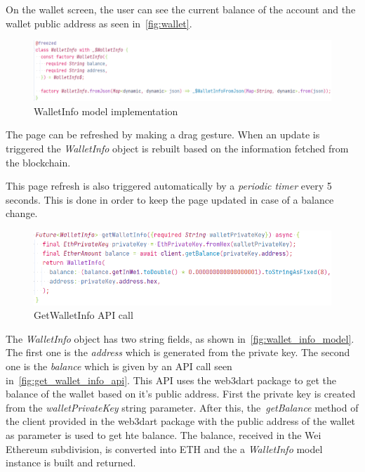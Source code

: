 \documentclass[a4paper,12pt]{report}
\begin{document}
On the wallet screen, the user can see the current balance of the account and
the wallet public address as seen in~\autoref{fig:wallet}.

\begin{figure}[H]
    \centering
    \includegraphics[scale=0.6]{images/code/wallet_info.png}
    \caption{WalletInfo model implementation}\label{fig:wallet_info_model}
\end{figure}

The page can be refreshed by making a drag gesture. When an update is triggered
the \textit{WalletInfo} object is rebuilt based on the information fetched from
the blockchain.

This page refresh is also triggered automatically by a \textit{periodic timer}
every 5 seconds. This is done in order to keep the page updated in case of a
balance change.

\begin{figure}[H]
    \centering
    \includegraphics[scale=0.6]{images/code/get_wallet_info.png}
    \caption{GetWalletInfo API call}\label{fig:get_wallet_info_api}
\end{figure}

The \textit{WalletInfo} object has two string fields, as shown
in~\autoref{fig:wallet_info_model}. The first one is the \textit{address} which
is generated from the private key. The second one is the \textit{balance} which
is given by an API call seen in~\autoref{fig:get_wallet_info_api}. This API
uses the web3dart package to get the balance of the wallet based on it's public
address. First the private key is created from the \textit{walletPrivateKey}
string parameter. After this, the~\textit{getBalance} method of the client
provided in the web3dart package with the public address of the wallet as
parameter is used to get hte balance. The balance, received in the Wei Ethereum
subdivision, is converted into ETH and the a \textit{WalletInfo} model instance
is built and returned.
\end{document}
